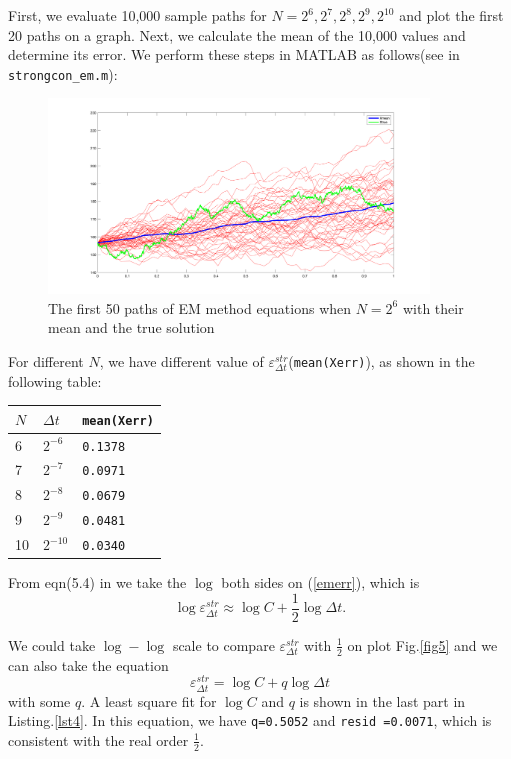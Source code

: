 \documentclass[12pt,a4paper]{article}
\theoremstyle{definition}
\begin{document}
First, we evaluate 10,000 sample paths for $N=2^6,2^7,2^8,2^9,2^{10}$ and plot the first 20 paths on a graph. Next, we calculate the mean of the 10,000 values and determine its error. We perform these steps in MATLAB as follows(see in \verb|strongcon_em.m|):


\begin{figure}[htbp]
\centering
\includegraphics[width=0.9\textwidth]{fig/fig4.png}
\caption{\label{fig4}The first 50 paths of EM method equations when $N=2^6$ with their mean and the true solution }
\end{figure}

For different $N$, we have different value of $\varepsilon_{\Delta t}^{str}$(\verb|mean(Xerr)|), as shown in the following table:
\begin{table}[htbp]
\centering
\begin{tabular}{lll}
\hline
$N$ & $\Delta t$ & \verb|mean(Xerr)| \\ \hline
6   & $2^{-6}$   & \verb|0.1378|     \\
7   & $2^{-7}$   & \verb|0.0971|     \\
8   & $2^{-8}$   & \verb|0.0679|     \\
9   & $2^{-9}$   & \verb|0.0481|     \\
10  & $2^{-10}$  & \verb|0.0340|    
\end{tabular}
\end{table}

From eqn(5.4) in \cite{higham._2001} we take the $\log$ both sides on (\ref{emerr}), which is \begin{equation}
    \label{5.4}
    \log \varepsilon_{\Delta t}^{str} \approx \log C+\frac{1}{2} \log \Delta t.
\end{equation}

We could take $\log-\log$ scale to compare $\varepsilon_{\Delta t}^{str}$ with $\frac{1}{2}$ on plot Fig.\ref{fig5} and we can also take the equation \begin{equation}
    \label{qemerr} \varepsilon_{\Delta t}^{str} = \log C+q\log \Delta t
\end{equation}
with some $q$. A least square fit for $\log C$ and $q$ is shown in the last part in Listing.\ref{lst4}. In this equation, we have \verb|q=0.5052| and \verb|resid =0.0071|, which is consistent with the real order $\frac{1}{2}$.
\end{document}
